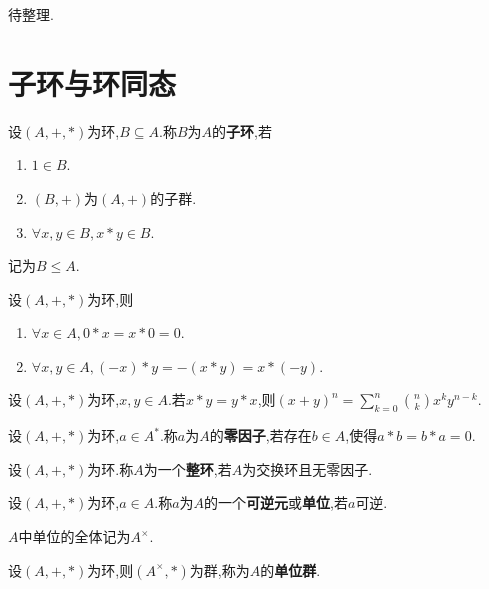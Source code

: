 待整理.

\section{子环与环同态}

\begin{deff}
    设$(A, +, *)$为环,$B \subseteq A$.称$B$为$A$的\textbf{子环},若
    \begin{enumerate}
        \item $1 \in B$.
        \item $(B, +)$为$(A, +)$的子群.
        \item $\forall x, y \in B, x * y \in B$.
    \end{enumerate}
    
    记为$B \leqslant A$.
\end{deff}

\begin{prop}
    设$(A, +, *)$为环,则
    \begin{enumerate}
        \item $\forall x \in A, 0 * x = x * 0 = 0$.
        \item $\forall x, y \in A, (- x) * y = - (x * y) = x * (- y)$.
    \end{enumerate}
\end{prop}

\begin{prop}
    设$(A, +, *)$为环,$x, y \in A$.若$x * y = y * x$,则$(x + y)^n = \sum\limits_{k=0}^n \binom{n}{k} x^k y^{n-k}$.
\end{prop}

\begin{deff}
    设$(A, +, *)$为环,$a \in A^*$.称$a$为$A$的\textbf{零因子},若存在$b \in A$,使得$a * b = b * a = 0$.
\end{deff}

\begin{deff}
    设$(A, +, *)$为环.称$A$为一个\textbf{整环},若$A$为交换环且无零因子.
\end{deff}

\begin{deff}
    设$(A, +, *)$为环,$a \in A$.称$a$为$A$的一个\textbf{可逆元}或\textbf{单位},若$a$可逆.

    $A$中单位的全体记为$A^{\times}$.
\end{deff}

\begin{rqq}
    设$(A, +, *)$为环,则$(A^{\times}, *)$为群,称为$A$的\textbf{单位群}.
\end{rqq}

